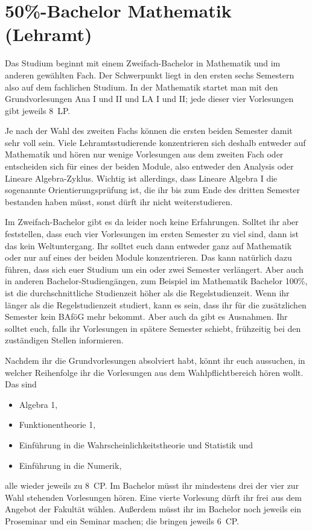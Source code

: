 \section{50\%-Bachelor Mathematik (Lehramt)}

Das Studium beginnt mit einem Zweifach-Bachelor in Mathematik und im anderen
gewählten Fach. Der Schwerpunkt liegt in den ersten sechs Semestern also auf
dem fachlichen Studium. In der Mathematik startet man mit den Grundvorlesungen
Ana I und II und LA I und II; jede dieser vier Vorlesungen gibt jeweils
8~\gls{LP}.

Je nach der Wahl des zweiten Fachs können die ersten beiden Semester damit sehr
voll sein. Viele Lehramtsstudierende konzentrieren sich deshalb entweder auf
Mathematik und hören nur wenige Vorlesungen aus dem zweiten Fach oder
entscheiden sich für eines der beiden Module, also entweder den Analysis oder
Lineare Algebra-Zyklus. Wichtig ist allerdings, dass Lineare Algebra I die
sogenannte Orientierungsprüfung ist, die ihr bis zum Ende des dritten Semester
bestanden haben müsst, sonst dürft ihr nicht weiterstudieren.

Im Zweifach-Bachelor gibt es da leider noch keine Erfahrungen. Solltet ihr
aber feststellen, dass euch vier Vorlesungen im ersten Semester zu viel sind,
dann ist das kein Weltuntergang. Ihr solltet euch dann entweder ganz auf
Mathematik oder nur auf eines der beiden Module konzentrieren. Das kann
natürlich dazu führen, dass sich euer Studium um ein oder zwei Semester
verlängert. Aber auch in anderen Bachelor-Studiengängen, zum Beispiel im
Mathematik Bachelor 100\%, ist die durchschnittliche Studienzeit höher als die
Regelstudienzeit.  Wenn ihr länger als die Regelstudienzeit studiert, kann es
sein, dass ihr für die zusätzlichen Semester kein BAföG mehr bekommt. Aber auch
da gibt es Ausnahmen.  Ihr solltet euch, falls ihr Vorlesungen in spätere
Semester schiebt, frühzeitig bei den zuständigen Stellen informieren.

Nachdem ihr die Grundvorlesungen absolviert habt, könnt ihr euch aussuchen, in
welcher Reihenfolge ihr die Vorlesungen aus dem Wahlpflichtbereich hören
wollt. Das sind
\begin{itemize}
  \item Algebra 1,
  \item Funktionentheorie 1,
  \item Einführung in die Wahrscheinlichkeitstheorie und Statistik und
  \item Einführung in die Numerik,
\end{itemize}
alle wieder jeweils zu 8~\gls{CP}. Im Bachelor müsst ihr mindestens drei der
vier zur Wahl stehenden Vorlesungen hören. Eine vierte Vorlesung  dürft ihr
frei aus dem Angebot der Fakultät wählen. Außerdem müsst ihr im Bachelor noch
jeweils ein Proseminar und ein Seminar machen; die bringen jeweils 6~\gls{CP}.

